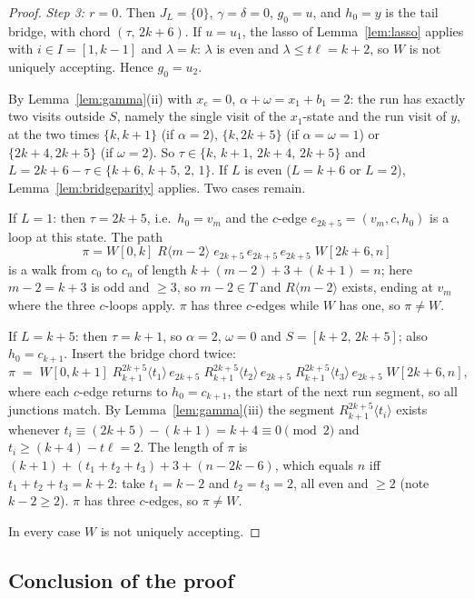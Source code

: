 \documentclass[11pt]{article}
\theoremstyle{definition}
\begin{document}
\begin{proof}
\emph{Step 3: $r=0$.} Then $J_L=\{0\}$, $\gamma=\delta=0$, $g_0=u$, and
$h_0=y$ is the tail bridge, with chord $(\tau,\,2k+6)$. If $u=u_1$, the
lasso of Lemma~\ref{lem:lasso} applies with $i\in I=[1,k-1]$ and
$\lambda=k$: $\lambda$ is even and $\lambda\le t\ell=k+2$, so $W$ is not
uniquely accepting. Hence $g_0=u_2$.

By Lemma~\ref{lem:gamma}(ii) with $x_e=0$, $\alpha+\omega=x_1+b_1=2$: the
run has exactly two visits outside $S$, namely the single visit of the
$x_1$-state and the run visit of $y$, at the two times
$\{k,k+1\}$ (if $\alpha=2$), $\{k,2k+5\}$ (if $\alpha=\omega=1$) or
$\{2k+4,2k+5\}$ (if $\omega=2$). So $\tau\in\{k,\,k+1,\,2k+4,\,2k+5\}$ and
$L=2k+6-\tau\in\{k+6,\,k+5,\,2,\,1\}$. If $L$ is even ($L=k+6$ or $L=2$),
Lemma~\ref{lem:bridgeparity} applies. Two cases remain.

If $L=1$: then $\tau=2k+5$, i.e.\ $h_0=v_m$ and the $c$-edge
$e_{2k+5}=(v_m,c,h_0)$ is a loop at this state. The path
\[
\pi=W[0,k]\;R\langle m-2\rangle\;e_{2k+5}\,e_{2k+5}\,e_{2k+5}\;W[2k+6,n]
\]
is a walk from $c_0$ to $c_n$ of length $k+(m-2)+3+(k+1)=n$; here
$m-2=k+3$ is odd and $\ge3$, so $m-2\in T$ and $R\langle m-2\rangle$
exists, ending at $v_m$ where the three $c$-loops apply. $\pi$ has three
$c$-edges while $W$ has one, so $\pi\ne W$.

If $L=k+5$: then $\tau=k+1$, so $\alpha=2$, $\omega=0$ and
$S=[k+2,\,2k+5]$; also $h_0=c_{k+1}$. Insert the bridge chord twice:
\[
\pi\;=\;W[0,k+1]\;R_{k+1}^{2k+5}\langle t_1\rangle\,e_{2k+5}\;
R_{k+1}^{2k+5}\langle t_2\rangle\,e_{2k+5}\;
R_{k+1}^{2k+5}\langle t_3\rangle\,e_{2k+5}\;W[2k+6,n],
\]
where each $c$-edge returns to $h_0=c_{k+1}$, the start of the next run
segment, so all junctions match. By Lemma~\ref{lem:gamma}(iii) the segment
$R_{k+1}^{2k+5}\langle t_i\rangle$ exists whenever
$t_i\equiv(2k+5)-(k+1)=k+4\equiv0\pmod2$ and
$t_i\ge(k+4)-t\ell=2$. The length of $\pi$ is
$(k+1)+(t_1+t_2+t_3)+3+(n-2k-6)$, which equals $n$ iff
$t_1+t_2+t_3=k+2$: take $t_1=k-2$ and $t_2=t_3=2$, all even and $\ge2$
(note $k-2\ge2$). $\pi$ has three $c$-edges, so $\pi\ne W$.

In every case $W$ is not uniquely accepting.
\end{proof}

\subsection{Conclusion of the proof}
\end{document}
